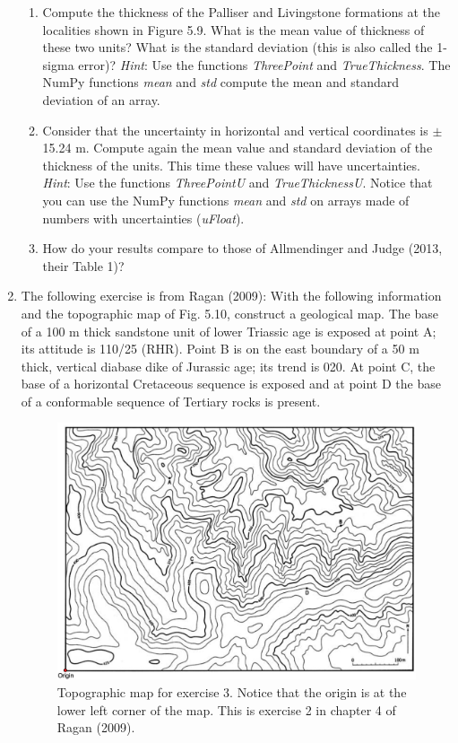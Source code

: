 \documentclass[a4paper , 12pt]{book}
\begin{document}
\begin{enumerate}
    \begin{enumerate}
        \item Compute the thickness of the Palliser and Livingstone formations at the localities shown in Figure 5.9. What is the mean value of thickness of these two units? What is the standard deviation (this is also called the 1-sigma error)? \textit{Hint}: Use the functions \textit{ThreePoint} and \textit{TrueThickness}. The NumPy functions \textit{mean} and \textit{std} compute the mean and standard deviation of an array.
        \item Consider that the uncertainty in horizontal and vertical coordinates is $\pm$15.24 m. Compute again the mean value and standard deviation of the thickness of the units. This time these values will have uncertainties. \textit{Hint}: Use the functions \textit{ThreePointU} and \textit{TrueThicknessU}. Notice that you can use the NumPy functions \textit{mean} and \textit{std} on arrays made of numbers with uncertainties (\textit{uFloat}).
        \item How do your results compare to those of Allmendinger and Judge (2013, their Table 1)?
    \end{enumerate}{}
    
    \item The following exercise is from Ragan (2009): With the following information and the topographic map of Fig. 5.10, construct a geological map. The base of a 100 m thick sandstone unit of lower Triassic age is exposed at point A; its attitude is 110/25 (RHR). Point B is on the east boundary of a 50 m thick, vertical diabase dike of Jurassic age; its trend is 020. At point C, the base of a horizontal Cretaceous sequence is exposed and at point D the base of a conformable sequence of Tertiary rocks is present.
    
    \begin{figure}[ht]
    \centering
    \includegraphics[width=13cm]{Figures/ch5f15.jpg}
    \caption{Topographic map for exercise 3. Notice that the origin is at the lower left corner of the map. This is exercise 2 in chapter 4 of Ragan (2009).}
    \end{figure}
    

\end{enumerate}
\end{document}
